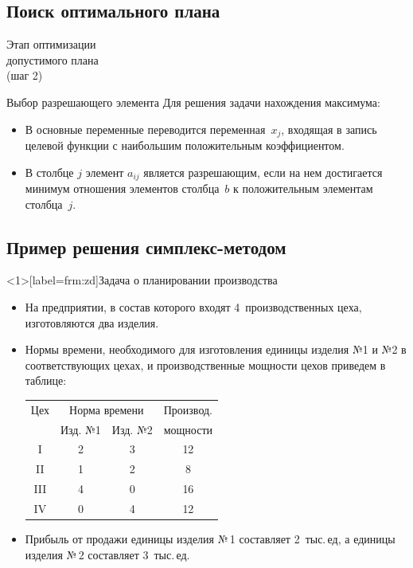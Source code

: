 \documentclass[unicode,11pt,notheorems]{beamer}
\begin{document}
\subsection{Поиск оптимального плана}
\begin{frame}{}{}
\centering 
\Large Этап оптимизации \\ допустимого плана\\ (шаг 2)

\end{frame}

\begin{frame}{Выбор разрешающего элемента}{}
Для решения задачи \alert{нахождения максимума}:
\begin{itemize}
\item 
	В основные переменные переводится переменная~$x_j$, входящая в запись целевой функции с наибольшим положительным коэффициентом.
\item  
	В столбце $j$ элемент $a_{ij}$ является разрешающим, если на нем достигается минимум отношения элементов столбца~$b$ к положительным элементам столбца~$j$.
\end{itemize}
\end{frame}  




\subsection{Пример решения симплекс-методом}
\begin{frame}<1>[label=frm:zd]{Задача о планировании производства}{}
\begin{itemize}
\item На предприятии, в состав которого входят 4~производственных цеха, изготовляются два изделия.
\item Нормы времени, необходимого для изготовления единицы изделия №1 и №2
в соответствующих цехах, и производственные мощности цехов приведем в таблице:

{\centering\begin{tabular}{|c|c|c|c|}
\hline
\rowcolor{cyan!20}Цех & \multicolumn{2}{c|}{Норма времени} & Производ.\\
\cline{2-3}
\rowcolor{cyan!20} ~   & Изд. №1 &Изд. №2 & мощности\\
\hline
I & 2 & 3 & 12\\
II & 1 & 2 & 8\\
III & 4 & 0 & 16\\
IV & 0 & 4 & 12\\
\hline
\end{tabular}\par}
\item Прибыль от продажи единицы изделия №\,1 составляет 2~тыс.\,ед, а единицы изделия №\,2 составляет 3~тыс.\,ед. 
\end{itemize}

\end{frame}   
\end{document}
